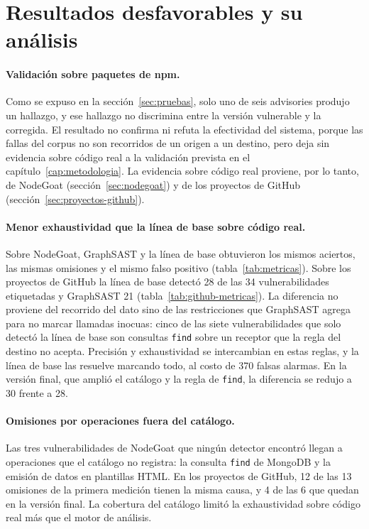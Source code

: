 \section{Resultados desfavorables y su análisis}\label{sec:resultados-negativos}

\paragraph{Validación sobre paquetes de npm.} Como se expuso en la
sección~\ref{sec:pruebas}, solo uno de seis advisories produjo un
hallazgo, y ese hallazgo no discrimina entre la versión vulnerable y la
corregida. El resultado no confirma ni refuta la efectividad del sistema,
porque las fallas del corpus no son recorridos de un origen a un
destino, pero deja sin evidencia sobre código real a la validación
prevista en el capítulo~\ref{cap:metodologia}. La evidencia sobre código
real proviene, por lo tanto, de NodeGoat (sección~\ref{sec:nodegoat}) y
de los proyectos de GitHub (sección~\ref{sec:proyectos-github}).

\paragraph{Menor exhaustividad que la línea de base sobre código real.}
Sobre NodeGoat, GraphSAST y la línea de base obtuvieron los mismos
aciertos, las mismas omisiones y el mismo falso positivo
(tabla~\ref{tab:metricas}). Sobre los proyectos de GitHub la línea de
base detectó 28 de las 34 vulnerabilidades etiquetadas y GraphSAST 21
(tabla~\ref{tab:github-metricas}). La diferencia no proviene del
recorrido del dato sino de las restricciones que GraphSAST agrega para
no marcar llamadas inocuas: cinco de las siete vulnerabilidades que solo
detectó la línea de base son consultas \texttt{find} sobre un receptor
que la regla del destino no acepta. Precisión y exhaustividad se
intercambian en estas reglas, y la línea de base las resuelve marcando
todo, al costo de 370 falsas alarmas. En la versión final, que amplió
el catálogo y la regla de \texttt{find}, la diferencia se redujo a 30
frente a 28.

\paragraph{Omisiones por operaciones fuera del catálogo.} Las tres
vulnerabilidades de NodeGoat que ningún detector encontró llegan a
operaciones que el catálogo no registra: la consulta \texttt{find} de
MongoDB y la emisión de datos en plantillas HTML. En los proyectos de
GitHub, 12 de las 13 omisiones de la primera medición tienen la misma
causa, y 4 de las 6 que quedan en la versión final. La cobertura del
catálogo limitó la exhaustividad sobre código real más que el motor de
análisis.

